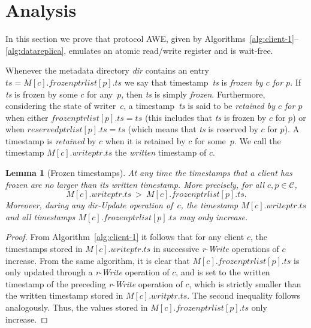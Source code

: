 \documentclass[oribibl]{llncs}
\newtheorem{lemma}[theorem]{Lemma}
\theoremstyle{definition-boldhead}
\newcommand{\var}[1]{\textit{#1}}
\newcommand{\op}[1]{\textsl{#1}}
\newcommand{\clientset}{\ensuremath{\mathcal{C}}\xspace}
\newcommand{\dir}{\var{dir}\xspace}
\newcommand{\NAME}{AWE\xspace}
\begin{document}
\if\submit\no
\section{Analysis}
\label{sec:proof}
\fi

\newcommand{\opr}{\ensuremath{o}\xspace}
\newcommand{\popr}{\ensuremath{o'}\xspace}
\newcommand{\opread}{\ensuremath{\op{Read}}\xspace}
\newcommand{\opwrite}{\ensuremath{\op{Write}}\xspace}
\newcommand{\tsopr}{\ensuremath{\var{ts}}\xspace}
\newcommand{\tspopr}{\ensuremath{\var{ts}'}\xspace}

\if\submit\no
In this section we prove that protocol \NAME, given by
Algorithms~\ref{alg:client-1}--\ref{alg:datareplica}, emulates an
atomic read/write register and is wait-free.

Whenever the metadata directory \var{dir} contains an entry $\var{ts}
= M[c].\var{frozenptrlist}[p].\var{ts}$ we say that timestamp~\var{ts}
is \emph{frozen by $c$ for $p$}.  If \var{ts} is frozen by some $c$
for any~$p$, then \var{ts} is simply \emph{frozen}.  Furthermore,
considering the state of writer~$c$, a timestamp~\var{ts} is said to
be \emph{retained by $c$ for $p$} when either
$\var{frozenptrlist}[p].\var{ts} = \var{ts}$ (this includes that
\var{ts} is frozen by $c$ for $p$) or when
$\var{reservedptrlist}[p].\var{ts} = \var{ts}$ (which means that
\var{ts} is reserved by $c$ for $p$).  A timestamp is \emph{retained}
by $c$ when it is retained by $c$ for some~$p$.  We call the timestamp
$M[c].\var{writeptr}.\var{ts}$ the \emph{written} timestamp of $c$.

\begin{lemma}[Frozen timestamps]\label{lem:timestamps}
  At any time the timestamps that a client has frozen
  are no larger than its written timestamp. More precisely, for all
  $c, p \in \clientset$,
  \[
    M[c].\var{writeptr}.\var{ts}
      \ > \ M[c].\var{frozenptrlist}[p].\var{ts}.
  \]
  Moreover, during any \dir-\op{Update} operation of~$c$, the
  timestamp $M[c].\var{writeptr}.\var{ts}$ and all timestamps
  $M[c].\var{frozenptrlist}[p].\var{ts}$ may only increase.
\end{lemma}

\begin{proof}
  From Algorithm~\ref{alg:client-1} it follows that for any client $c$, the
  timestamps stored in $M[c].\var{writeptr}.\var{ts}$ in successive
  \var{r}-\op{Write} operations of $c$ increase.
  From the same algorithm, it is clear that
  $M[c].\var{frozenptrlist}[p].\var{ts}$ is only updated through a
  \var{r}-\op{Write} operation of $c$, and is set to the written timestamp
  of the preceding \var{r}-\op{Write} operation of $c$, which is
  strictly smaller than the written timestamp stored in
  $M[c].\var{writptr}.\var{ts}$.  The second inequality
  follows analogously.  Thus, the values stored in
  $M[c].\var{frozenptrlist}[p].\var{ts}$ only increase.
\end{proof}
\end{document}
